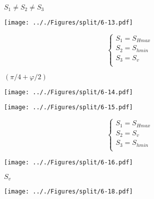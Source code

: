 \documentclass[onecolumn,11pt]{report}
\def\lthtmlcheckvsize{\ifdim\ht\sizebox<\vsize 
  \ifdim\wd\sizebox<\hsize\expandafter\hfill\fi \expandafter\vfill
  \else\expandafter\vss\fi}%
\begin{document}
{\newpage\clearpage
{}%
$ S_1 \neq S_2 \neq S_3$%
\lthtmlindisplaymathZ
\lthtmlcheckvsize\clearpage}

{\newpage\clearpage
{}%
\texttt{[image: .././Figures/split/6-13.pdf]}%
\lthtmlpictureZ
\lthtmlcheckvsize\clearpage}

{\newpage\clearpage
{}%
\begin{displaymath}\left\lbrace
\begin{array}{l}
S_1 = S_{Hmax} \\
S_2 = S_{hmin} \\
S_3 = S_v \\
\end{array}
\right.\end{displaymath}%
\lthtmldisplayZ
\lthtmlcheckvsize\clearpage}

{\newpage\clearpage
{}%
$ (\pi/4 + \varphi/2)$%
\lthtmlindisplaymathZ
\lthtmlcheckvsize\clearpage}

{\newpage\clearpage
{}%
\texttt{[image: .././Figures/split/6-14.pdf]}%
\lthtmlpictureZ
\lthtmlcheckvsize\clearpage}

{\newpage\clearpage
{}%
\texttt{[image: .././Figures/split/6-15.pdf]}%
\lthtmlpictureZ
\lthtmlcheckvsize\clearpage}

{\newpage\clearpage
{}%
\begin{displaymath}\left\lbrace
\begin{array}{l}
S_1 = S_{Hmax} \\
S_2 = S_v \\
S_3 = S_{hmin} \\
\end{array}
\right.\end{displaymath}%
\lthtmldisplayZ
\lthtmlcheckvsize\clearpage}

{\newpage\clearpage
{}%
\texttt{[image: .././Figures/split/6-16.pdf]}%
\lthtmlpictureZ
\lthtmlcheckvsize\clearpage}

{\newpage\clearpage
{}%
$ S_{v}$%
\lthtmlindisplaymathZ
\lthtmlcheckvsize\clearpage}

{\newpage\clearpage
{}%
\texttt{[image: .././Figures/split/6-18.pdf]}%
\lthtmlpictureZ
\lthtmlcheckvsize\clearpage}
\end{document}
